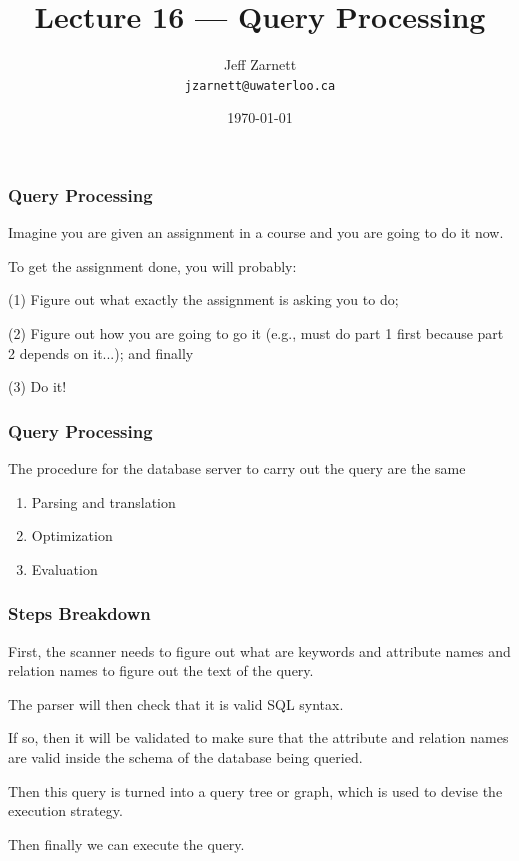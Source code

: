 

\title{Lecture 16 --- Query Processing }

\author{Jeff Zarnett \\ \small \texttt{jzarnett@uwaterloo.ca}}
\date{\today}




\begin{frame}
  \titlepage

 \end{frame}

\begin{frame}
\frametitle{Query Processing}

Imagine you are given an assignment in a course and you are going to do it now. 

To get the assignment done, you will probably: 

(1) Figure out what exactly the assignment is asking you to do; 

(2) Figure out how you are going to go it (e.g., must do part 1 first because part 2 depends on it...); and finally 

(3) Do it! 

\end{frame}


\begin{frame}
\frametitle{Query Processing}

The procedure for the database server to carry out the query are the same

\begin{enumerate}
	\item Parsing and translation
	\item Optimization
	\item Evaluation
\end{enumerate}

\end{frame}

\begin{frame}
\frametitle{Steps Breakdown}
First, the scanner needs to figure out what are keywords and attribute names and relation names to figure out the text of the query. 

The parser will then check that it is valid SQL syntax. 

If so, then it will be validated to make sure that the attribute and relation names are valid inside the schema of the database being queried. 

Then this query is turned into a query tree or graph, which is used to devise the execution strategy. 

Then finally we can execute the query.

\end{frame}

